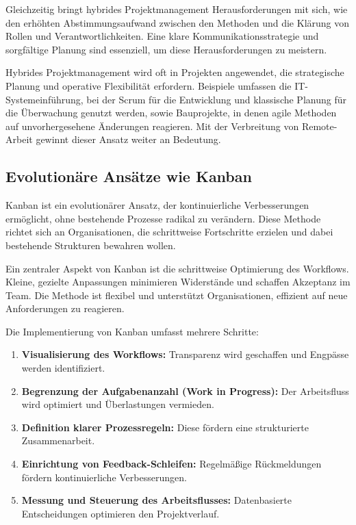 \documentclass[ngerman]{seminarvorlage}
\begin{document}
Gleichzeitig bringt hybrides Projektmanagement Herausforderungen mit sich, wie den erhöhten Abstimmungsaufwand zwischen den Methoden und die Klärung von Rollen und Verantwortlichkeiten. Eine klare Kommunikationsstrategie und sorgfältige Planung sind essenziell, um diese Herausforderungen zu meistern.

Hybrides Projektmanagement wird oft in Projekten angewendet, die strategische Planung und operative Flexibilität erfordern. Beispiele umfassen die IT-Systemeinführung, bei der Scrum für die Entwicklung und klassische Planung für die Überwachung genutzt werden, sowie Bauprojekte, in denen agile Methoden auf unvorhergesehene Änderungen reagieren. Mit der Verbreitung von Remote-Arbeit gewinnt dieser Ansatz weiter an Bedeutung.
\cite{cassini_agile_2024, kupeli_hybrides_2023, dittmann_hybrides_2023}

\subsection{Evolutionäre Ansätze wie Kanban}
Kanban ist ein evolutionärer Ansatz, der kontinuierliche Verbesserungen ermöglicht, ohne bestehende Prozesse radikal zu verändern. Diese Methode richtet sich an Organisationen, die schrittweise Fortschritte erzielen und dabei bestehende Strukturen bewahren wollen.

Ein zentraler Aspekt von Kanban ist die schrittweise Optimierung des Workflows. Kleine, gezielte Anpassungen minimieren Widerstände und schaffen Akzeptanz im Team. Die Methode ist flexibel und unterstützt Organisationen, effizient auf neue Anforderungen zu reagieren. 

Die Implementierung von Kanban umfasst mehrere Schritte:
\begin{enumerate}
    \item \textbf{Visualisierung des Workflows:} Transparenz wird geschaffen und Engpässe werden identifiziert.
    \item \textbf{Begrenzung der Aufgabenanzahl (Work in Progress):} Der Arbeitsfluss wird optimiert und Überlastungen vermieden.
    \item \textbf{Definition klarer Prozessregeln:} Diese fördern eine strukturierte Zusammenarbeit.
    \item \textbf{Einrichtung von Feedback-Schleifen:} Regelmä\ss{}ige Rückmeldungen fördern kontinuierliche Verbesserungen.
    \item \textbf{Messung und Steuerung des Arbeitsflusses:} Datenbasierte Entscheidungen optimieren den Projektverlauf.
\end{enumerate}
\end{document}
